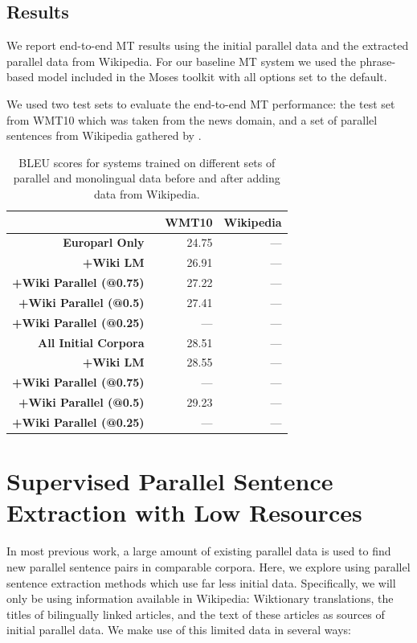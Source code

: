 \subsection{Results}
We report end-to-end MT results using the initial parallel data and the
extracted parallel data from Wikipedia. For our baseline MT system we used the
phrase-based model included in the Moses toolkit \citet{Koehn07} with all
options set to the default. %

We used two test sets to evaluate the end-to-end MT performance: the test set
from WMT10 which was taken from the news domain, and a set of parallel sentences
from Wikipedia gathered by \citep{Smith10}.

\begin{table}[ht]
\begin{center}
\begin{tabular}{|r||r|r|}
\hline
      & WMT10        & Wikipedia \\
\hline
\textbf{Europarl Only} \
      & 24.75       & ---    \\
\textbf{+Wiki LM} \
      & 26.91       & ---    \\
\textbf{+Wiki Parallel (@0.75)} \
      & 27.22       & ---    \\
\textbf{+Wiki Parallel (@0.5)} \
      & 27.41       & ---    \\
\textbf{+Wiki Parallel (@0.25)} \
      & ---       & ---    \\
\hline
\textbf{All Initial Corpora} \
      & 28.51       & ---    \\
\textbf{+Wiki LM} \
      & 28.55       & ---    \\
\textbf{+Wiki Parallel (@0.75)} \
      & ---       & ---    \\
\textbf{+Wiki Parallel (@0.5)} \
      & 29.23       & ---    \\
\textbf{+Wiki Parallel (@0.25)} \
      & ---       & ---    \\
\hline
\end{tabular}
\end{center}
\caption{BLEU scores for systems trained on different sets of parallel and
monolingual data before and after adding data from Wikipedia.}
\label{table:esen_bleu}
\end{table}

\section{Supervised Parallel Sentence Extraction with Low Resources}
In most previous work, a large amount of existing parallel data is used to find
new parallel sentence pairs in comparable corpora. Here, we explore using
parallel sentence extraction methods which use far less initial data.
Specifically, we will only be using information available in Wikipedia:
Wiktionary translations, the titles of bilingually linked articles, and the text
of these articles as sources of initial parallel data. We make use of this
limited data in several ways:

